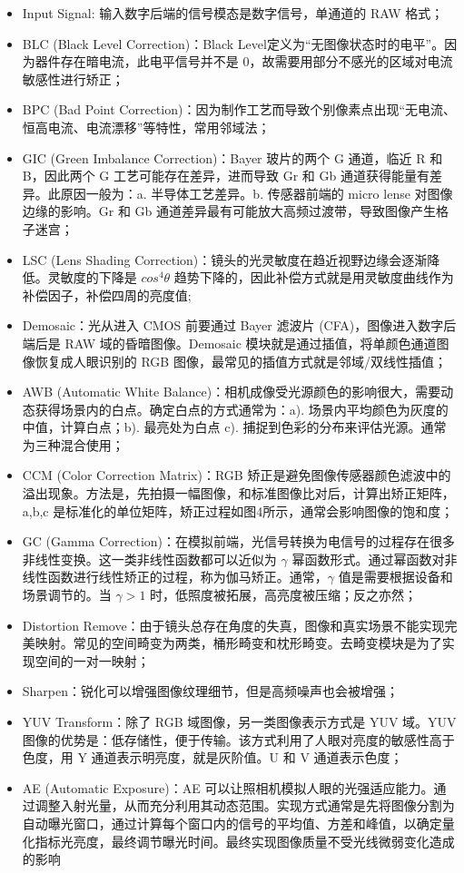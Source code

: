 \documentclass[cn,10pt,math=newtx,citestyle=gb7714-2015,bibstyle=gb7714-2015]{elegantbook}
\begin{document}
\begin{itemize}
  \item Input Signal: 输入数字后端的信号模态是数字信号，单通道的 RAW 格式；
  \item BLC (Black Level Correction)：Black Level定义为“无图像状态时的电平”。因为器件存在暗电流，此电平信号并不是 0，故需要用部分不感光的区域对电流敏感性进行矫正；
  \item BPC (Bad Point Correction)：因为制作工艺而导致个别像素点出现“无电流、恒高电流、电流漂移”等特性，常用邻域法；
  \item GIC (Green Imbalance Correction)：Bayer 玻片的两个 G 通道，临近 R 和 B，因此两个 G 工艺可能存在差异，进而导致 Gr 和 Gb 通道获得能量有差异。此原因一般为：a. 半导体工艺差异。b. 传感器前端的 micro lense 对图像边缘的影响。Gr 和 Gb 通道差异最有可能放大高频过渡带，导致图像产生格子迷宫；
  \item LSC (Lens Shading Correction)：镜头的光灵敏度在趋近视野边缘会逐渐降低。灵敏度的下降是 $cos^{4}\theta$ 趋势下降的，因此补偿方式就是用灵敏度曲线作为补偿因子，补偿四周的亮度值;
  \item Demosaic：光从进入 CMOS 前要通过 Bayer 滤波片 (CFA)，图像进入数字后端后是 RAW 域的昏暗图像。Demosaic 模块就是通过插值，将单颜色通道图像恢复成人眼识别的 RGB 图像，最常见的插值方式就是邻域/双线性插值；
  \item AWB (Automatic White Balance)：相机成像受光源颜色的影响很大，需要动态获得场景内的白点。确定白点的方式通常为：a). 场景内平均颜色为灰度的中值，计算白点；b). 最亮处为白点 c). 捕捉到色彩的分布来评估光源。通常为三种混合使用；
  \item CCM (Color Correction Matrix)：RGB 矫正是避免图像传感器颜色滤波中的溢出现象。方法是，先拍摄一幅图像，和标准图像比对后，计算出矫正矩阵，{a,b,c} 是标准化的单位矩阵，矫正过程如图4所示，通常会影响图像的饱和度；
  \item GC (Gamma Correction)：在模拟前端，光信号转换为电信号的过程存在很多非线性变换。这一类非线性函数都可以近似为 $\gamma$ 幂函数形式。通过幂函数对非线性函数进行线性矫正的过程，称为伽马矫正。通常，$\gamma$ 值是需要根据设备和场景调节的。当 $\gamma > 1$ 时，低照度被拓展，高亮度被压缩；反之亦然；
  \item Distortion Remove：由于镜头总存在角度的失真，图像和真实场景不能实现完美映射。常见的空间畸变为两类，桶形畸变和枕形畸变。去畸变模块是为了实现空间的一对一映射；
  \item Sharpen：锐化可以增强图像纹理细节，但是高频噪声也会被增强；
  \item YUV Transform：除了 RGB 域图像，另一类图像表示方式是 YUV 域。YUV 图像的优势是：低存储性，便于传输。该方式利用了人眼对亮度的敏感性高于色度，用 Y 通道表示明亮度，就是灰阶值。U 和 V 通道表示色度；
  \item AE (Automatic Exposure)：AE 可以让照相机模拟人眼的光强适应能力。通过调整入射光量，从而充分利用其动态范围。实现方式通常是先将图像分割为自动曝光窗口，通过计算每个窗口内的信号的平均值、方差和峰值，以确定量化指标光亮度，最终调节曝光时间。最终实现图像质量不受光线微弱变化造成的影响
\end{itemize}
\end{document}

